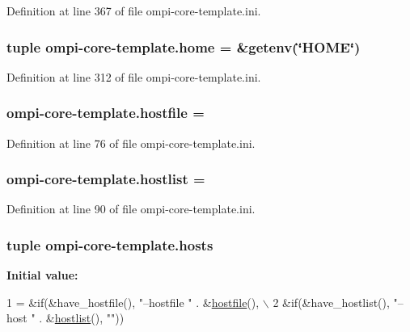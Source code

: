 Definition at line 367 of file ompi-\/core-\/template.\-ini.

\hypertarget{namespaceompi-core-template_ae80397dcb3454ac02e396f9faec83f92}{
\subsubsection[{home}]{\setlength{\rightskip}{0pt plus 5cm}tuple ompi-\/core-\/template.\-home = \&getenv(\char`\"{}H\-O\-M\-E\char`\"{})}}\label{namespaceompi-core-template_ae80397dcb3454ac02e396f9faec83f92}


Definition at line 312 of file ompi-\/core-\/template.\-ini.

\hypertarget{namespaceompi-core-template_aed8287cfdf838bf38fe4e39ae97c2e9c}{
\subsubsection[{hostfile}]{\setlength{\rightskip}{0pt plus 5cm}ompi-\/core-\/template.\-hostfile =}}\label{namespaceompi-core-template_aed8287cfdf838bf38fe4e39ae97c2e9c}


Definition at line 76 of file ompi-\/core-\/template.\-ini.

\hypertarget{namespaceompi-core-template_a398a79c984b3635ab67f829c9865510e}{
\subsubsection[{hostlist}]{\setlength{\rightskip}{0pt plus 5cm}ompi-\/core-\/template.\-hostlist =}}\label{namespaceompi-core-template_a398a79c984b3635ab67f829c9865510e}


Definition at line 90 of file ompi-\/core-\/template.\-ini.

\hypertarget{namespaceompi-core-template_a07fe97780730a6b76bec87d365cc8bd6}{
\subsubsection[{hosts}]{\setlength{\rightskip}{0pt plus 5cm}tuple ompi-\/core-\/template.\-hosts}}\label{namespaceompi-core-template_a07fe97780730a6b76bec87d365cc8bd6}
{\bfseries Initial value\-:}
\begin{DoxyCode}
1 = &if(&have\_hostfile(), \textcolor{stringliteral}{"--hostfile "} . &\hyperlink{namespaceompi-core-template_aed8287cfdf838bf38fe4e39ae97c2e9c}{hostfile}(), \(\backslash\)
2             &if(&have\_hostlist(), \textcolor{stringliteral}{"--host "} . &\hyperlink{namespaceompi-core-template_a398a79c984b3635ab67f829c9865510e}{hostlist}(), \textcolor{stringliteral}{""}))
\end{DoxyCode}


